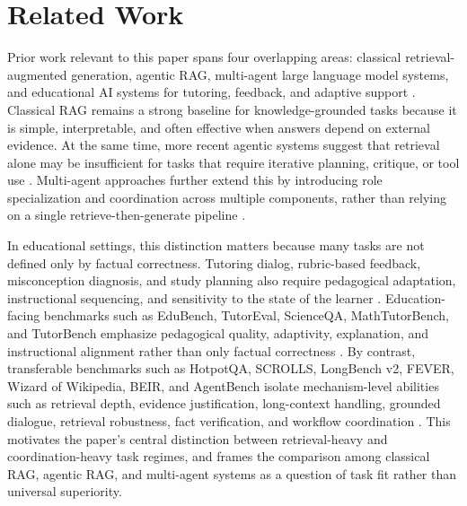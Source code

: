 \section{Related Work}

Prior work relevant to this paper spans four overlapping areas: classical retrieval-augmented generation, agentic RAG, multi-agent large language model systems, and educational AI systems for tutoring, feedback, and adaptive support \cite{chevalier2024sciencetutors,liu2026agenttutor,macina2025mathtutorbench,srinivasa2025tutorbench,xu2025edubench}. Classical RAG remains a strong baseline for knowledge-grounded tasks because it is simple, interpretable, and often effective when answers depend on external evidence. At the same time, more recent agentic systems suggest that retrieval alone may be insufficient for tasks that require iterative planning, critique, or tool use \cite{nguyen2025marag,radeva2025coordination}. Multi-agent approaches further extend this by introducing role specialization and coordination across multiple components, rather than relying on a single retrieve-then-generate pipeline \cite{liu2023agentbench,nguyen2025marag,radeva2025coordination}.

In educational settings, this distinction matters because many tasks are not defined only by factual correctness. Tutoring dialog, rubric-based feedback, misconception diagnosis, and study planning also require pedagogical adaptation, instructional sequencing, and sensitivity to the state of the learner \cite{chevalier2024sciencetutors,liu2026agenttutor,macina2025mathtutorbench,srinivasa2025tutorbench,xu2025edubench}. Education-facing benchmarks such as EduBench, TutorEval, ScienceQA, MathTutorBench, and TutorBench emphasize pedagogical quality, adaptivity, explanation, and instructional alignment rather than only factual correctness \cite{xu2025edubench,chevalier2024sciencetutors,lu2022scienceqa,macina2025mathtutorbench,srinivasa2025tutorbench}. By contrast, transferable benchmarks such as HotpotQA, SCROLLS, LongBench v2, FEVER, Wizard of Wikipedia, BEIR, and AgentBench isolate mechanism-level abilities such as retrieval depth, evidence justification, long-context handling, grounded dialogue, retrieval robustness, fact verification, and workflow coordination \cite{yang2018hotpotqa,shaham2022scrolls,bai2024longbench2,thorne2018fever,dinan2019wizard,thakur2021beir,liu2023agentbench}.  This motivates the paper's central distinction between retrieval-heavy and coordination-heavy task regimes, and frames the comparison among classical RAG, agentic RAG, and multi-agent systems as a question of task fit rather than universal superiority.
